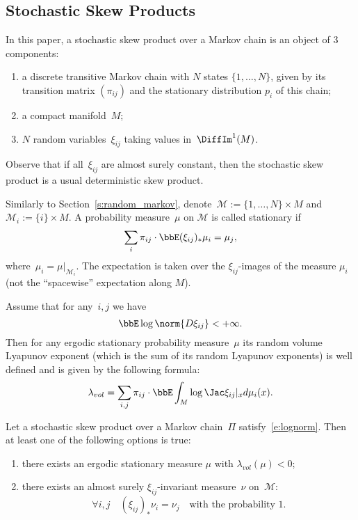 \documentclass[a4paper,12pt]{amsart}
\begin{document}
\subsection{Stochastic Skew Products}

In this paper, a stochastic skew product over a Markov chain is an object of 3 components:
\begin{enumerate}
  \item a discrete transitive Markov chain with $N$ states $\{1,\dots, N\}$, given by its transition matrix $(\pi_{ij})$ and the stationary distribution $p_i$ of this chain;
  \item a compact manifold~$M$;
  \item $N$ random variables~$\xi_{ij}$ taking values in~$\DiffIm^1(M)$.
\end{enumerate}
Observe that if all~$\xi_{ij}$ are almost surely constant, then the stochastic skew product is a usual deterministic skew product.

Similarly to Section~\ref{s:random_markov}, denote~$\mathcal{M} := \{ 1, \dots, N \} \times M$ and $\mathcal{M}_i := \{ i \} \times M$. A probability measure~$\mu$ on $\mathcal{M}$ is called stationary if
\begin{equation}\label{e:stoch_img_2}
  \sum_i \pi_{ij}  \cdot \bbE (\xi_{ij})_* \mu_i = \mu_j,
\end{equation}
where~$\mu_i = \mu|_{\mathcal{M}_i}$. The expectation is taken over the $\xi_{ij}$-images of the measure $\mu_i$ (not the ``spacewise'' expectation along $M$).

Assume that for any~$i,j$ we have
\begin{equation}\label{e:lognorm}
\bbE \log \norm{D\xi_{ij}} < +\infty.
\end{equation}
Then for any ergodic stationary probability measure~$\mu$ its random volume Lyapunov exponent (which is the sum of its random Lyapunov exponents) is well defined and is given by the following formula:
\begin{equation}\label{e:lyap-vol}
    \lambda_{vol} = \sum_{i,j} \pi_{ij} \cdot \bbE \int_M \log \Jac \xi_{ij}|_x d\mu_i(x).
\end{equation}

\begin{Thm} \label{t:baxendale}
Let a stochastic skew product over a Markov chain~$\Pi$ satisfy~\eqref{e:lognorm}. Then at least one of the following options is true:
\begin{enumerate}
  \item\label{i:esm} there exists an ergodic stationary measure $\mu$ with $\lambda_{vol}(\mu) < 0$;
  \item\label{i:asi} there exists an almost surely $\xi_{ij}$-invariant measure~$\nu$ on~$\mathcal{M}$:
  $$
    \forall i,j \quad (\xi_{ij})_* \nu_i = \nu_j \quad \text{with the probability~$1$}.
  $$
\end{enumerate}
\end{Thm}
\end{document}
